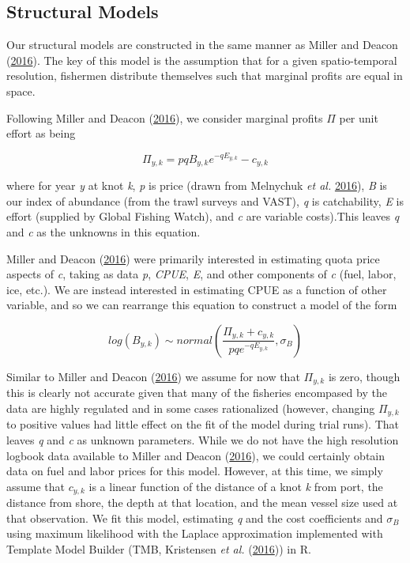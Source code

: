 \documentclass[twoside,12pt,final]{ucthesis-CA2012}
\begin{document}
\begin{ucmainmatter}
\subsection{Structural Models}\label{structural-models}

Our structural models are constructed in the same manner as Miller and
Deacon (\protect\hyperlink{ref-Miller2016}{2016}). The key of this model
is the assumption that for a given spatio-temporal resolution, fishermen
distribute themselves such that marginal profits are equal in space.

Following Miller and Deacon (\protect\hyperlink{ref-Miller2016}{2016}),
we consider marginal profits \(\Pi\) per unit effort as being

\[\Pi_{y,k} = pqB_{y,k}e^{-qE_{y,k}} - c_{y,k}\]

where for year \emph{y} at knot \emph{k}, \emph{p} is price (drawn from
Melnychuk \emph{et al.} \protect\hyperlink{ref-Melnychuk2016}{2016}),
\emph{B} is our index of abundance (from the trawl surveys and VAST),
\emph{q} is catchability, \emph{E} is effort (supplied by Global Fishing
Watch), and \emph{c} are variable costs).This leaves \emph{q} and
\emph{c} as the unknowns in this equation.

Miller and Deacon (\protect\hyperlink{ref-Miller2016}{2016}) were
primarily interested in estimating quota price aspects of \emph{c},
taking as data \emph{p}, \emph{CPUE}, \emph{E}, and other components of
\emph{c} (fuel, labor, ice, etc.). We are instead interested in
estimating CPUE as a function of other variable, and so we can rearrange
this equation to construct a model of the form

\[log(B_{y,k}) \sim normal(\frac{\Pi_{y,k} + c_{y,k}}{pqe^{-qE_{y,k}}}, \sigma_B)\]

Similar to Miller and Deacon (\protect\hyperlink{ref-Miller2016}{2016})
we assume for now that \(\Pi_{y,k}\) is zero, though this is clearly not
accurate given that many of the fisheries encompased by the data are
highly regulated and in some cases rationalized (however, changing
\(\Pi_{y,k}\) to positive values had little effect on the fit of the
model during trial runs). That leaves \emph{q} and \emph{c} as unknown
parameters. While we do not have the high resolution logbook data
available to Miller and Deacon
(\protect\hyperlink{ref-Miller2016}{2016}), we could certainly obtain
data on fuel and labor prices for this model. However, at this time, we
simply assume that \(c_{y,k}\) is a linear function of the distance of a
knot \emph{k} from port, the distance from shore, the depth at that
location, and the mean vessel size used at that observation. We fit this
model, estimating \emph{q} and the cost coefficients and \(\sigma_B\)
using maximum likelihood with the Laplace approximation implemented with
Template Model Builder (TMB, Kristensen \emph{et al.}
(\protect\hyperlink{ref-Kristensen2016}{2016})) in R.


\end{ucmainmatter}
\end{document}
